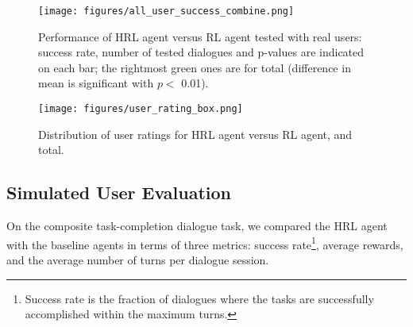 \documentclass[11pt,letterpaper]{article}
\begin{document}
\begin{figure}[htb]
\centering
\texttt{[image: figures/all\_user\_success\_combine.png]}
\vspace{-6mm}
\caption{Performance of HRL agent versus RL agent tested with real users: success rate, number of tested dialogues and p-values are indicated on each bar; the rightmost green ones are for total (difference in mean is significant with $p <$ 0.01).}
\label{fig:user_success_rate}
\vspace{-3mm}
\end{figure}
\begin{figure}[htb]
\centering
\texttt{[image: figures/user\_rating\_box.png]}
\vspace{-6mm}
\caption{Distribution of user ratings for HRL agent versus RL agent, and total.}
\label{fig:user_rating}
\vspace{-2mm}
\end{figure}

\subsection{Simulated User Evaluation}

On the composite task-completion dialogue task, we compared the HRL agent with the baseline agents in terms of three metrics: success rate\footnote{Success rate is the fraction of dialogues where the tasks are successfully accomplished within the maximum turns. 
}, average rewards, and the average number of turns per dialogue session.

\end{document}
